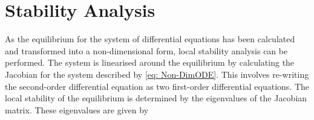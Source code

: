 \section{Stability Analysis}







As the equilibrium for the system of differential equations has been calculated and transformed into a non-dimensional form, local stability analysis can be performed. The system is linearised around the equilibrium by calculating the Jacobian for the system described by \cref{eq: Non-DimODE}. This involves re-writing the second-order differential equation as two first-order differential equations. The local stability of the equilibrium is determined by the eigenvalues of the Jacobian matrix. These eigenvalues are given by


